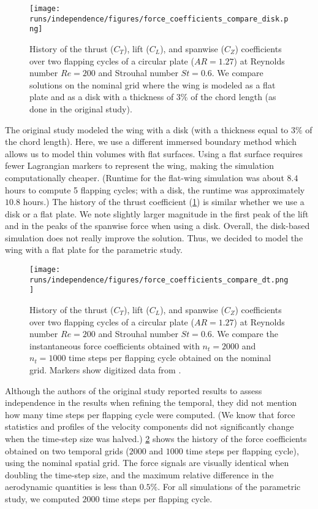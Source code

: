 \begin{figure}
  \centering
  \texttt{[image: runs/independence/figures/force\_coefficients\_compare\_disk.png]}
  \caption{History of the thrust ($C_T$), lift ($C_L$), and spanwise ($C_Z$) coefficients over two flapping cycles of a circular plate ($AR = 1.27$) at Reynolds number $Re = 200$ and Strouhal number $St = 0.6$. We compare solutions on the nominal grid where the wing is modeled as a flat plate and as a disk with a thickness of $3\%$ of the chord length (as done in the original study\supercite{li_dong_2016}).}
  \label{fig:independence_force_coefficients_disk}
\end{figure}

The original study modeled the wing with a disk (with a thickness equal to $3\%$ of the chord length).
Here, we use a different immersed boundary method which allows us to model thin volumes with flat surfaces.
Using a flat surface requires fewer Lagrangian markers to represent the wing, making the simulation computationally cheaper.
(Runtime for the flat-wing simulation was about $8.4$ hours to compute 5 flapping cycles; with a disk, the runtime was approximately $10.8$ hours.)
The history of the thrust coefficient (\cref{fig:independence_force_coefficients_disk}) is similar whether we use a disk or a flat plate.
We note slightly larger magnitude in the first peak of the lift and in the peaks of the spanwise force when using a disk.
Overall, the disk-based simulation does not really improve the solution.
Thus, we decided to model the wing with a flat plate for the parametric study.

\begin{figure}
  \centering
  \texttt{[image: runs/independence/figures/force\_coefficients\_compare\_dt.png]}
  \caption{History of the thrust ($C_T$), lift ($C_L$), and spanwise ($C_Z$) coefficients over two flapping cycles of a circular plate ($AR = 1.27$) at Reynolds number $Re = 200$ and Strouhal number $St = 0.6$. We compare the instantaneous force coefficients obtained with $n_t = 2000$ and $n_t = 1000$ time steps per flapping cycle obtained on the nominal grid. Markers show digitized data from \citet{li_dong_2016}.}
  \label{fig:independence_force_coefficients_dt}
\end{figure}

Although the authors of the original study reported results to assess independence in the results when refining the temporal, they did not mention how many time steps per flapping cycle were computed.
(We know that force statistics and profiles of the velocity components did not significantly change when the time-step size was halved.)
\cref{fig:independence_force_coefficients_dt} shows the history of the force coefficients obtained on two temporal grids ($2000$ and $1000$ time steps per flapping cycle), using the nominal spatial grid.
The force signals are visually identical when doubling the time-step size, and the maximum relative difference in the aerodynamic quantities is less than $0.5\%$.
For all simulations of the parametric study, we computed $2000$ time steps per flapping cycle.

